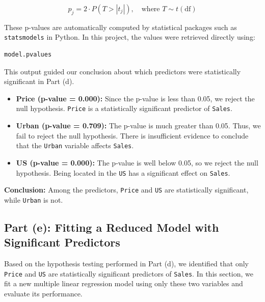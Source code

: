 \documentclass[12pt]{article}
\begin{document}
\[
p_j = 2 \cdot P(T > |t_j|), \quad \text{where } T \sim t(\text{df})
\]

These p-values are automatically computed by statistical packages such as \texttt{statsmodels} in Python. In this project, the values were retrieved directly using:

\begin{verbatim}
model.pvalues
\end{verbatim}

This output guided our conclusion about which predictors were statistically significant in Part (d).

\begin{itemize}
  \item \textbf{Price (p-value = 0.000):} Since the p-value is less than 0.05, we reject the null hypothesis. \texttt{Price} is a statistically significant predictor of \texttt{Sales}.
  
  \item \textbf{Urban (p-value = 0.709):} The p-value is much greater than 0.05. Thus, we fail to reject the null hypothesis. There is insufficient evidence to conclude that the \texttt{Urban} variable affects \texttt{Sales}.
  
  \item \textbf{US (p-value = 0.000):} The p-value is well below 0.05, so we reject the null hypothesis. Being located in the \texttt{US} has a significant effect on \texttt{Sales}.
\end{itemize}

\noindent
\textbf{Conclusion:} Among the predictors, \texttt{Price} and \texttt{US} are statistically significant, while \texttt{Urban} is not.

\subsection*{Part (e): Fitting a Reduced Model with Significant Predictors}

Based on the hypothesis testing performed in Part (d), we identified that only \texttt{Price} and \texttt{US} are statistically significant predictors of \texttt{Sales}. In this section, we fit a new multiple linear regression model using only these two variables and evaluate its performance.
\end{document}
